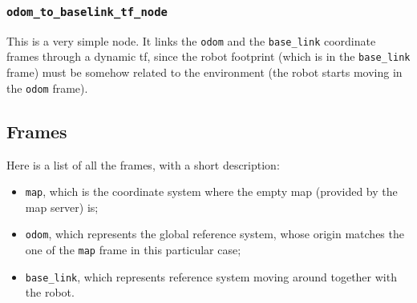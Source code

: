 \documentclass[11pt,a4paper]{article}
\begin{document}
\subsubsection{\texttt{odom\_to\_baselink\_tf\_node}}

This is a very simple node. It links the \texttt{odom} and the \texttt{base\_link}
coordinate frames through a dynamic tf, since the robot footprint (which is in the \texttt{base\_link}
frame) must be somehow related to the environment (the robot starts moving in the \texttt{odom} frame).



\subsection{Frames}

Here is a list of all the frames, with a short description:
\begin{itemize}
    \item \texttt{map}, which is the coordinate system where the empty map (provided by the map server) is;
    \item \texttt{odom}, which represents the global reference system, whose origin matches the one of
            the \texttt{map} frame in this particular case;
    \item \texttt{base\_link}, which represents reference system moving around together with the robot.
\end{itemize}
\end{document}
